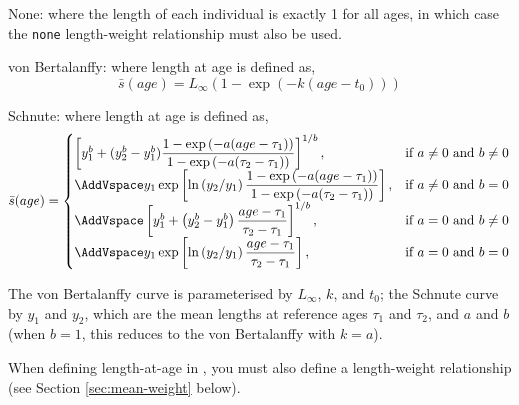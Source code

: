 \begin{description}
\item {None:} where the length of each individual is exactly 1 for all ages, in which case the \texttt{none} length-weight relationship must also be used.
\item{von Bertalanffy:} where length at age is defined as,
\begin{equation} 
\bar{s}(age)= L_\infty \left( 1 - \exp \left( -k \left(age-t_0 \right) \right) \right)
\end{equation}

\item{Schnute:} where length at age is defined as,
\begin{equation}
\bar{s}(age)=\displaystyle\begin{cases}
  \left[ y_1^b + (y_2^b - y_1^b) \dfrac{1-\exp \left(-a(age - \tau_1) \right)}{1-\exp \left(-a(\tau_2 - \tau_1) \right)} \right]^{1/b}, & \text{if $a\ne0$ and $b\ne0$} \\
  \AddVspace
  y_1 \exp \left[ \ln \left( y_2 / y_1 \right) \dfrac{1-\exp \left(-a(age - \tau_1) \right)}{1-\exp \left(-a(\tau_2 - \tau_1) \right)} \right], & \text{if $a\ne0$ and $b=0$} \\
  \AddVspace
  \left[ y_1^b + \left( y_2^b - y_1^b \right) \dfrac{age-\tau_1}{\tau_2 - \tau_1} \right]^{1/b}, & \text{if $a=0$ and $b\ne0$} \\
  \AddVspace
  y_1 \exp \left[ \ln \left( y_2/y_1 \right) \dfrac{age-\tau_1}{\tau_2 - \tau_1} \right] , & \text{if $a=0$ and $b=0$} \\
  \end{cases}
\end{equation}
\end{description}

The von Bertalanffy curve is parameterised by $L_\infty$, $k$, and $t_0$; the Schnute curve \citep{836} by $y_1$ and $y_2$, which are the mean lengths at reference ages $\tau_1$ and $\tau_2$, and $a$ and $b$ (when $b=1$, this reduces to the von Bertalanffy with $k=a$). 

When defining length-at-age in \CAS, you must also define a length-weight relationship (see Section \ref{sec:mean-weight} below).

\subsubsection*{}

